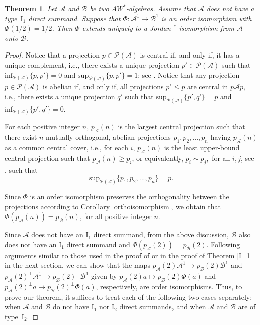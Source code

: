 \documentclass[12pt]{amsart}
\newtheorem{thm}{Theorem}[section]
\theoremstyle{definition}
\theoremstyle{remark}
\numberwithin{equation}{section}
\begin{document}
\begin{thm}\label{Jordan}
Let $\mathcal{A}$ and $\mathcal{B}$ be two $AW^*$-algebras. Assume that $\mathcal{A}$ does not have a type~$\mathrm{I}_1$ direct summand. Suppose that $\Phi:\mathcal{A}^1\to\mathcal{B}^1$ is an order isomorphism with $\Phi(1/2)=1/2$. Then $\Phi$ extends  uniquely to a  Jordan $^*$-isomorphism from $\mathcal{A}$ onto $\mathcal{B}$.   
\end{thm}  
\begin{proof}
Notice  that  a projection $p\in \mathcal{P(A)}$ is central if, and only if, it has a unique complement, i.e., there exists a unique projection  $p'\in\mathcal{P(A)}$ such that $\mathrm{inf}_{\mathcal{P(A)}}\{p,p'\}=0$ and $\mathrm{sup}_{\mathcal{P(A)}}\{p,p'\}=1$; see \cite[Theorem 6.6]{Kaplansky}. Notice that   any projection  $p\in\mathcal{P(A)}$ is abelian if, and only if, all projections   $p'\leq p$ are central in $p\mathcal{A}p$, i.e., there exists a unique projection $q'$ such that $\mathrm{sup}_\mathcal{P(A)}\{p',q'\}=p$ and $\mathrm{inf}_\mathcal{P(A)}\{p',q'\}=0$. 

For each  positive integer $n$,  $p_\mathcal{A}(n)$	 is  the  largest  central projection    such that there exist $n$  mutually orthogonal, abelian projections $p_1,p_2,...,p_n$     having  $p_\mathcal{A}(n)$ as a common central cover, i.e., for each $i$, $p_\mathcal{A}(n)$ is the least  upper-bound    central projection such that $p_\mathcal{A}(n)\geq p_i$,  or equivalently, $p_i\sim p_j,$ for all $i,j$, see \cite[Proposition 1, p. 33;   Remark 5, Proposition 1, p. 111 ]{Berberian}, such that $$\mathrm{sup}_\mathcal{P(A)}\{p_1,p_2,...,p_n\}=p.$$  


Since $\Phi$ is an order isomorphism preserves the orthogonality between the projections according to Corollary \ref{orthoisomorphism}, we obtain that $\Phi(p_\mathcal{A}(n))=p_\mathcal{B}(n)$, for all positive integer $n$. 

Since $\mathcal{A}$ does not have  an $\mathrm{I}_1$ direct summand, from the above discussion,  $\mathcal{B}$ also does not  have an $\mathrm{I}_1$ direct summand and $\Phi(p_\mathcal{A}(2))=p_\mathcal{B}(2) $.  Following arguments similar to those used in the proof of \cite[Lemma 3.4]{mori} or in the proof of Theorem \ref{I_1} in the next section, we  can show that the maps $p_\mathcal{A}(2)\mathcal{A}^1\to p_\mathcal{B}(2)\mathcal{B}^1$ and $p_\mathcal{A}(2)^{\perp}\mathcal{A}^1\to p_\mathcal{B}(2)^\perp\mathcal{B}^1$ given by $p_\mathcal{A}(2)a\mapsto p_\mathcal{B}(2)\Phi(a)$ and $p_\mathcal{A}(2)^\perp a\mapsto p_\mathcal{B}(2)^\perp\Phi(a)$, respectively, are order isomorphisms. Thus,  to prove our theorem,  it  suffices to treat each of the following  two cases separately: when $\mathcal{A}$ and $\mathcal{B}$ do not have $\mathrm{I}_1$ nor $\mathrm{I}_2$ direct summands, and when $\mathcal{A}$ and $\mathcal{B}$ are of type~$\mathrm{I}_2$.	


\end{proof}
\end{document}
